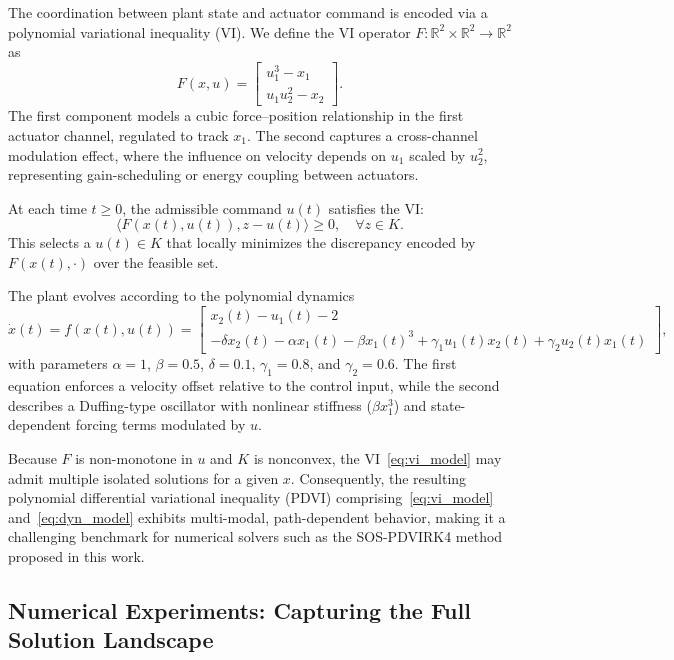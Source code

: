 \documentclass[sn-basic,Numbered]{sn-jnl}
\theoremstyle{thmstyleone}%
\begin{document}
The coordination between plant state and actuator command is encoded via a polynomial variational inequality (VI). We define the VI operator $F: \mathbb{R}^2 \times \mathbb{R}^2 \to \mathbb{R}^2$ as
\[
F(x, u) = 
\begin{bmatrix}
u_1^3 - x_1 \\
u_1 u_2^2 - x_2
\end{bmatrix}.
\]
The first component models a cubic force–position relationship in the first actuator channel, regulated to track $x_1$. The second captures a cross-channel modulation effect, where the influence on velocity depends on $u_1$ scaled by $u_2^2$, representing gain-scheduling or energy coupling between actuators.

At each time $t \geq 0$, the admissible command $u(t)$ satisfies the VI:
\begin{equation}
    \langle F(x(t), u(t)), z - u(t) \rangle \geq 0, \quad \forall z \in K.
    \label{eq:vi_model}
\end{equation}
This selects a $u(t) \in K$ that locally minimizes the discrepancy encoded by $F(x(t), \cdot)$ over the feasible set.

The plant evolves according to the polynomial dynamics
\begin{equation}
    \dot{x}(t) = f(x(t), u(t)) = 
    \begin{bmatrix}
        x_2(t) - u_1(t) - 2 \\
        -\delta x_2(t) - \alpha x_1(t) - \beta x_1(t)^3 + \gamma_1 u_1(t) x_2(t) + \gamma_2 u_2(t) x_1(t)
    \end{bmatrix},
    \label{eq:dyn_model}
\end{equation}
with parameters $\alpha = 1$, $\beta = 0.5$, $\delta = 0.1$, $\gamma_1 = 0.8$, and $\gamma_2 = 0.6$. The first equation enforces a velocity offset relative to the control input, while the second describes a Duffing-type oscillator with nonlinear stiffness ($\beta x_1^3$) and state-dependent forcing terms modulated by $u$.

Because $F$ is non-monotone in $u$ and $K$ is nonconvex, the VI~\eqref{eq:vi_model} may admit multiple isolated solutions for a given $x$. Consequently, the resulting polynomial differential variational inequality (PDVI) comprising~\eqref{eq:vi_model} and~\eqref{eq:dyn_model} exhibits multi-modal, path-dependent behavior, making it a challenging benchmark for numerical solvers such as the SOS-PDVIRK4 method proposed in this work.



\subsection{Numerical Experiments: Capturing the Full Solution Landscape}
\end{document}

